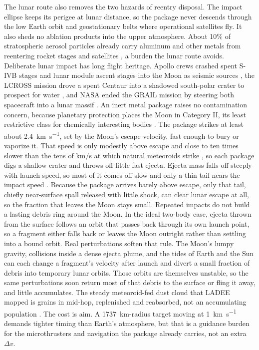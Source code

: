 \documentclass{article}
\newcommand{\deltav}{\Delta v}
\begin{document}
The lunar route also removes the two hazards of reentry disposal. The impact ellipse keeps its perigee at lunar distance, so the package never descends through the low Earth orbit and geostationary belts where operational satellites fly. It also sheds no ablation products into the upper atmosphere. About 10\% of stratospheric aerosol particles already carry aluminum and other metals from reentering rocket stages and satellites \cite{murphy2023metals}, a burden the lunar route avoids. Deliberate lunar impact has long flight heritage. Apollo crews crashed spent S-IVB stages and lunar module ascent stages into the Moon as seismic sources \cite{latham1970impacts}, the LCROSS mission drove a spent Centaur into a shadowed south-polar crater to prospect for water \cite{colaprete2010lcross}, and NASA ended the GRAIL mission by steering both spacecraft into a lunar massif \cite{grail_impact_nasa}. An inert metal package raises no contamination concern, because planetary protection places the Moon in Category II, its least restrictive class for chemically interesting bodies \cite{cospar_pp_moon}. The package strikes at least about \SI{2.4}{\kilo\meter\per\second}, set by the Moon's escape velocity, fast enough to bury or vaporize it. That speed is only modestly above escape and close to ten times slower than the tens of km/s at which natural meteoroids strike \cite{suggs2014lunarflux}, so each package digs a shallow crater and throws off little fast ejecta. Ejecta mass falls off steeply with launch speed, so most of it comes off slow and only a thin tail nears the impact speed \cite{housen2011ejecta,hyodo2020escape}. Because the package arrives barely above escape, only that tail, chiefly near-surface spall released with little shock, can clear lunar escape at all, so the fraction that leaves the Moon stays small. Repeated impacts do not build a lasting debris ring around the Moon. In the ideal two-body case, ejecta thrown from the surface follows an orbit that passes back through its own launch point, so a fragment either falls back or leaves the Moon outright rather than settling into a bound orbit. Real perturbations soften that rule. The Moon's lumpy gravity, collisions inside a dense ejecta plume, and the tides of Earth and the Sun can each change a fragment's velocity after launch and divert a small fraction of debris into temporary lunar orbits. Those orbits are themselves unstable, so the same perturbations soon return most of that debris to the surface or fling it away, and little accumulates. The steady meteoroid-fed dust cloud that LADEE mapped is grains in mid-hop, replenished and reabsorbed, not an accumulating population \cite{horanyi2015dustcloud}. The cost is aim. A \SI{1737}{\kilo\meter}-radius target moving at \SI{1}{\kilo\meter\per\second} demands tighter timing than Earth's atmosphere, but that is a guidance burden for the microthrusters and navigation the package already carries, not an extra $\deltav$.
\end{document}
